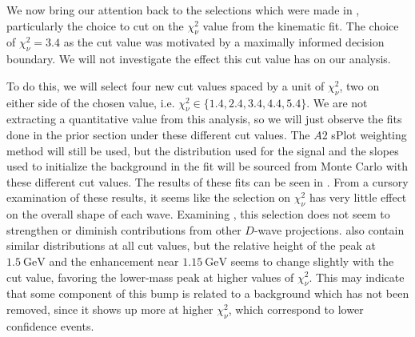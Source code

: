 We now bring our attention back to the selections which were made in , particularly the choice to cut on the $\chi^2_\nu$ value from the kinematic fit. The choice of $\chi^2_\nu = 3.4$ as the cut value was motivated by a maximally informed decision boundary. We will not investigate the effect this cut value has on our analysis.

To do this, we will select four new cut values spaced by a unit of $\chi^2_\nu$, two on either side of the chosen value, i.e. $\chi^2_\nu \in \{1.4, 2.4, 3.4, 4.4, 5.4\}$. We are not extracting a quantitative value from this analysis, so we will just observe the fits done in the prior section under these different cut values. The $A2$ sPlot weighting method will still be used, but the distribution used for the signal and the slopes used to initialize the background in the fit will be sourced from Monte Carlo with these different cut values. The results of these fits can be seen in . From a cursory examination of these results, it seems like the selection on $\chi^2_\nu$ has very little effect on the overall shape of each wave. Examining , this selection does not seem to strengthen or diminish contributions from other $D$-wave projections.  also contain similar distributions at all cut values, but the relative height of the peak at $\SI{1.5}{\giga\electronvolt}$ and the enhancement near $\SI{1.15}{\giga\electronvolt}$ seems to change slightly with the cut value, favoring the lower-mass peak at higher values of $\chi^2_\nu$. This may indicate that some component of this bump is related to a background which has not been removed, since it shows up more at higher $\chi^2_\nu$, which correspond to lower confidence events.

